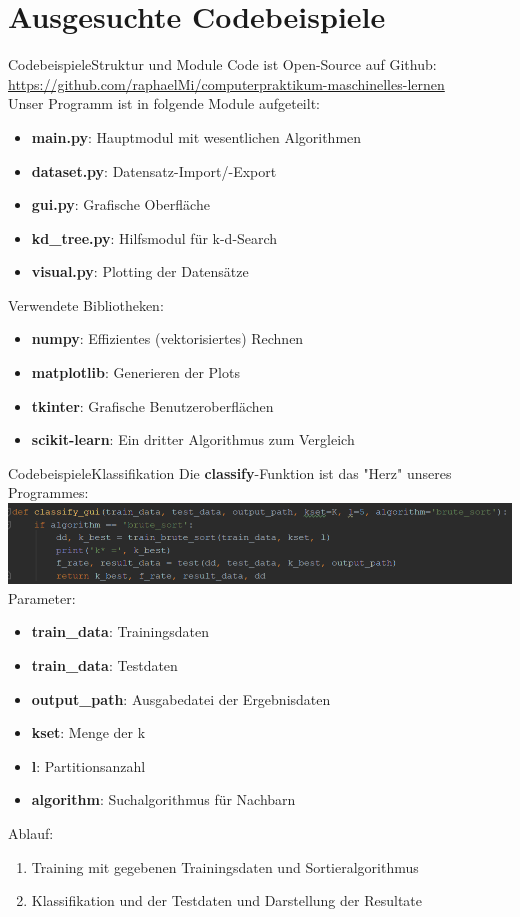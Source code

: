 \documentclass[9pt]{beamer}
\begin{document}
\section{Ausgesuchte Codebeispiele}
\begin{frame}{Codebeispiele}{Struktur und Module}
Code ist Open-Source auf Github: \url{https://github.com/raphaelMi/computerpraktikum-maschinelles-lernen}\\[0.4em]
Unser Programm ist in folgende Module aufgeteilt:
\begin{itemize}
\item{\textbf{main.py}: Hauptmodul mit wesentlichen Algorithmen}
\item{\textbf{dataset.py}: Datensatz-Import/-Export}
\item{\textbf{gui.py}: Grafische Oberfläche}
\item{\textbf{kd\_tree.py}: Hilfsmodul für k-d-Search}
\item{\textbf{visual.py}: Plotting der Datensätze}
\end{itemize}

Verwendete Bibliotheken:
\begin{itemize}
\item{\textbf{numpy}: Effizientes (vektorisiertes) Rechnen}
\item{\textbf{matplotlib}: Generieren der Plots}
\item{\textbf{tkinter}: Grafische Benutzeroberflächen}
\item{\textbf{scikit-learn}: Ein dritter Algorithmus zum Vergleich}
\end{itemize}
\end{frame}
\begin{frame}{Codebeispiele}{Klassifikation}
Die \textbf{classify}-Funktion ist das "Herz" unseres Programmes:
\includegraphics[scale=0.633]{assets/classify_brute.png}\\[0.4em]
Parameter:
\begin{itemize}
\item{\textbf{train\_data}: Trainingsdaten}
\item{\textbf{train\_data}: Testdaten}
\item{\textbf{output\_path}: Ausgabedatei der Ergebnisdaten}
\item{\textbf{kset}: Menge der k}
\item{\textbf{l}: Partitionsanzahl}
\item{\textbf{algorithm}: Suchalgorithmus für Nachbarn}
\end{itemize}
Ablauf:
\begin{enumerate}[1.]
\item{Training mit gegebenen Trainingsdaten und Sortieralgorithmus}
\item{Klassifikation und der Testdaten und Darstellung der Resultate}
\end{enumerate}
\end{frame}
\end{document}
